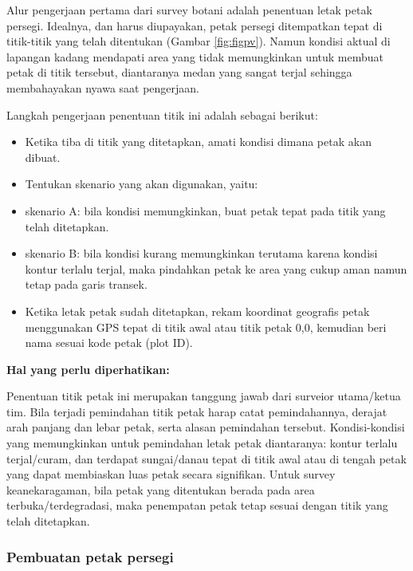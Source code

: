 \documentclass[
  oneside]{book}
\providecommand{\tightlist}{%
  \setlength{\itemsep}{0pt}\setlength{\parskip}{0pt}}
\begin{document}
Alur pengerjaan pertama dari survey botani adalah penentuan letak petak persegi. Idealnya, dan harus diupayakan, petak persegi ditempatkan tepat di titik-titik yang telah ditentukan (Gambar \ref{fig:figpv}). Namun kondisi aktual di lapangan kadang mendapati area yang tidak memungkinkan untuk membuat petak di titik tersebut, diantaranya medan yang sangat terjal sehingga membahayakan nyawa saat pengerjaan.

Langkah pengerjaan penentuan titik ini adalah sebagai berikut:

\begin{itemize}
\tightlist
\item
  Ketika tiba di titik yang ditetapkan, amati kondisi dimana petak akan dibuat.
\item
  Tentukan skenario yang akan digunakan, yaitu:
\item
  skenario A: bila kondisi memungkinkan, buat petak tepat pada titik yang telah ditetapkan.
\item
  skenario B: bila kondisi kurang memungkinkan terutama karena kondisi kontur terlalu terjal, maka pindahkan petak ke area yang cukup aman namun tetap pada garis transek.
\item
  Ketika letak petak sudah ditetapkan, rekam koordinat geografis petak menggunakan GPS tepat di titik awal atau titik petak 0,0, kemudian beri nama sesuai kode petak (plot ID).
\end{itemize}

\textbf{Hal yang perlu diperhatikan:}

Penentuan titik petak ini merupakan tanggung jawab dari surveior utama/ketua tim. Bila terjadi pemindahan titik petak harap catat pemindahannya, derajat arah panjang dan lebar petak, serta alasan pemindahan tersebut. Kondisi-kondisi yang memungkinkan untuk pemindahan letak petak diantaranya: kontur terlalu terjal/curam, dan terdapat sungai/danau tepat di titik awal atau di tengah petak yang dapat membiaskan luas petak secara signifikan. Untuk survey keanekaragaman, bila petak yang ditentukan berada pada area terbuka/terdegradasi, maka penempatan petak tetap sesuai dengan titik yang telah ditetapkan.

\hypertarget{pembuatan-petak-persegi}{%
\subsubsection*{Pembuatan petak persegi}\label{pembuatan-petak-persegi}}
\end{document}
